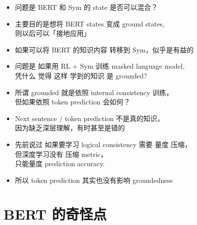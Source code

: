 \begin{itemize}
	\item 问题是 BERT 和 Sym 的 state 是否可以混合？
	\item 主要目的是想将 BERT states 变成 ground states,\\
		则以后可以「接地应用」
	\item 如果可以将 BERT 的知识内容 转移到 Sym，似乎是有益的
	\item 问题是 如果用 RL + Sym 训练 masked language model, \\
		凭什么 觉得 这样 学到的知识 是 grounded?
	\item 所谓 grounded 就是依照 internal consistency 训练，\\
		但如果依照 token prediction 会如何？
	\item Next sentence / token prediction 不是真的知识，\\
		因为缺乏深层理解，有时甚至是错的
	\item 先前说过 如果要学习 logical consistency 需要 量度 压缩，\\
		但深度学习没有 压缩 metric，\\
		只能量度 prediction accuracy.
	\item 所以 token prediction 其实也没有影响 groundedness
\end{itemize}

\section*{BERT 的奇怪点}

